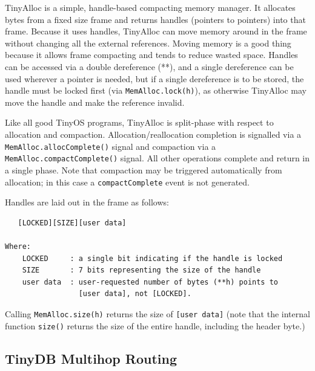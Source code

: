 \documentclass[11pt]{article}
\renewcommand{\baselinestretch}{1.2}
\begin{document}
TinyAlloc is a simple, handle-based compacting memory manager.  It
allocates bytes from a fixed size frame and returns handles (pointers
to pointers) into that frame.  Because it uses handles, TinyAlloc can
move memory around in the frame without changing all the external
references.  Moving memory is a good thing because it allows frame
compacting and tends to reduce wasted space.  Handles can be accessed
via a double dereference (**), and a single dereference can be used
wherever a pointer is needed, but if a single dereference is to be
stored, the handle must be locked first (via {\tt MemAlloc.lock(h)}),
as otherwise TinyAlloc may move the handle and make the reference
invalid.  

\vspace{.1in}
\renewcommand{\baselinestretch}{1.0}\rm
{}
\renewcommand{\baselinestretch}{1.2}\rm
\vspace{.1in}

   Like all good TinyOS programs, TinyAlloc is
   split-phase with
respect to allocation and compaction.  Allocation/reallocation
completion is signalled via a {\tt MemAlloc.allocComplete()} signal and
compaction via a {\tt MemAlloc.compactComplete()} signal.  All other
operations complete and return in a single phase. Note that compaction
may be triggered automatically from allocation; in this case a
{\tt compactComplete}  event is not generated.

Handles are laid out in the frame as follows:
\begin{verbatim}
   [LOCKED][SIZE][user data] 

Where: 
    LOCKED     : a single bit indicating if the handle is locked 
    SIZE       : 7 bits representing the size of the handle 
    user data  : user-requested number of bytes (**h) points to
                 [user data], not [LOCKED].
\end{verbatim}
   Calling {\tt MemAlloc.size(h)} returns the size of {\tt [user
data]} (note that the internal function {\tt size()} returns the size of the
entire handle, including the header byte.)

\subsection{TinyDB Multihop Routing} \label{sec:tinydbnetwork}
\end{document}
